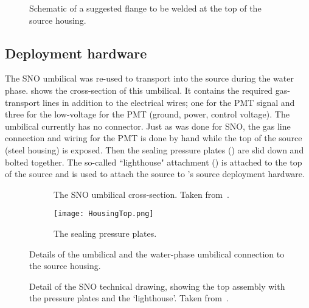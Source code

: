 \begin{figure}
\caption{\label{fig:flange} Schematic of a suggested flange to be welded at the top of the source housing. }
\end{figure}

\subsection{Deployment hardware}

The SNO \Li umbilical was re-used to transport \Li into the source during the {\snop} water phase.
 shows the cross-section of this umbilical. It contains the required gas-transport lines in addition to the electrical wires; one for the PMT signal and three for the low-voltage for the PMT (ground, power, control voltage). 
The umbilical currently has no connector. 
Just as was done for SNO, the gas line connection and wiring for the PMT is done by hand while the top of the source (steel housing) is exposed. 
Then the sealing pressure plates () are slid down and bolted together. 
The so-called ``lighthouse" attachment () is attached to the top of the source and is used to attach the source to {\snop}'s source deployment hardware.

\begin{figure}
\begin{subfigure}{.57\textwidth}
\caption{\label{fig:sno_umbilical} The SNO \Li umbilical cross-section. Taken from~\cite{Tagg:2001}.}
\end{subfigure}
\hspace{0.5cm}
\begin{subfigure}{.35\textwidth}
  \texttt{[image: HousingTop.png]}
  \caption{\label{fig:pressureplates} The sealing pressure plates.}
\end{subfigure}
\caption{Details of the umbilical and the water-phase umbilical connection to the source housing.}
\end{figure}

\begin{figure}
\caption{\label{fig:connection}Detail of the SNO \Li technical drawing, showing the top assembly with the pressure plates and the `lighthouse'. Taken from~\cite{Tagg:2001}.}
\end{figure}

